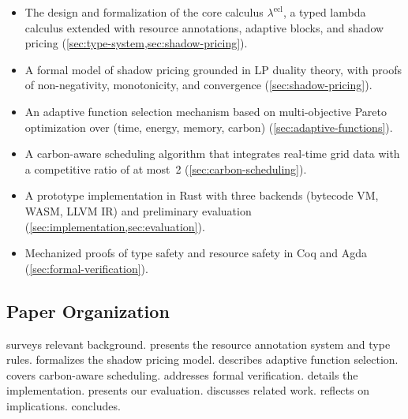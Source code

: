 \documentclass[11pt,a4paper]{article}
\begin{document}
\begin{itemize}
  \item The design and formalization of the core calculus $\lambda^{\mathrm{ecl}}$,
    a typed lambda calculus extended with resource annotations, adaptive blocks,
    and shadow pricing (\cref{sec:type-system,sec:shadow-pricing}).

  \item A formal model of shadow pricing grounded in LP duality theory, with
    proofs of non-negativity, monotonicity, and convergence
    (\cref{sec:shadow-pricing}).

  \item An adaptive function selection mechanism based on multi-objective Pareto
    optimization over (time, energy, memory, carbon)
    (\cref{sec:adaptive-functions}).

  \item A carbon-aware scheduling algorithm that integrates real-time grid
    data with a competitive ratio of at most~2 (\cref{sec:carbon-scheduling}).

  \item A prototype implementation in Rust with three backends (bytecode VM,
    WASM, LLVM IR) and preliminary evaluation (\cref{sec:implementation,sec:evaluation}).

  \item Mechanized proofs of type safety and resource safety in Coq and Agda
    (\cref{sec:formal-verification}).
\end{itemize}

\subsection{Paper Organization}

 surveys relevant background.
 presents the resource annotation system and type rules.
 formalizes the shadow pricing model.
 describes adaptive function selection.
 covers carbon-aware scheduling.
 addresses formal verification.
 details the implementation.
 presents our evaluation.
 discusses related work.
 reflects on implications.
 concludes.


\end{document}
